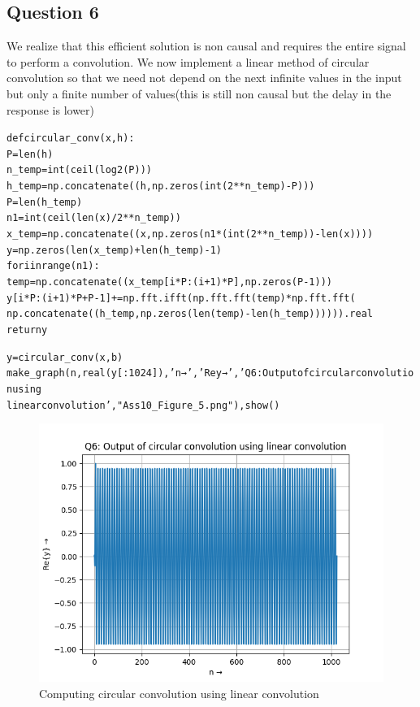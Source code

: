 \documentclass{article}
\begin{document}
\subsection{Question 6}
We realize that this efficient solution is non causal and requires the entire signal to perform a convolution. We now implement a linear method of circular convolution so that we need not depend on the next infinite values in the input but only a finite number of values(this is still non causal but the delay in the response is lower)
\begin{alltt}

def circular_conv(x, h):
    P = len(h)
    n_temp = int(ceil(log2(P)))
    h_temp = np.concatenate((h, np.zeros(int(2**n_temp) - P)))
    P = len(h_temp)
    n1 = int(ceil(len(x)/2**n_temp))
    x_temp = np.concatenate((x, np.zeros(n1*(int(2**n_temp)) - len(x))))
    y = np.zeros(len(x_temp) + len(h_temp) - 1)
    for i in range(n1):
        temp = np.concatenate((x_temp[i*P:(i + 1)*P], np.zeros(P - 1)))
        y[i*P:(i + 1)*P + P - 1] += np.fft.ifft(np.fft.fft(temp) * np.fft.fft( 
        np.concatenate((h_temp,np.zeros(len(temp)-len(h_temp))) ))).real
    return y

y = circular_conv(x, b)
make_graph(n, real(y[:1024]), 'n →', 'Re{y} →', 'Q6: Output of circular convolution using 
linear convolution', "Ass10_Figure_5.png"), show()

\end{alltt}
\begin{figure}[h!]
\centering
\includegraphics[scale=0.6]{Ass10_Figure_5.png}
\caption{Computing circular convolution using linear convolution}
\label{fig:universe}
\end{figure}
\end{document}
